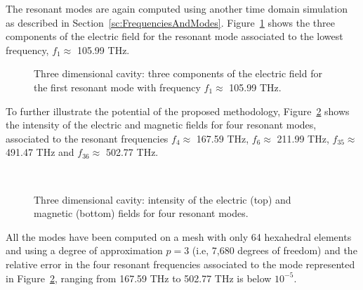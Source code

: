 The resonant modes are again computed using another time domain simulation as described in Section~\ref{sc:FrequenciesAndModes}. Figure~\ref{fig:cubeFreeSpace_1stMode} shows the three components of the electric field for the resonant mode associated to the lowest frequency, $f_1 \approx$ 105.99 THz.
\begin{figure}[!ht]
	\centering
	\caption{Three dimensional cavity: three components of the electric field for the first resonant mode with frequency $f_1 \approx$ 105.99 THz.}
	\label{fig:cubeFreeSpace_1stMode}
\end{figure}

To further illustrate the potential of the proposed methodology, Figure~\ref{fig:cubeFreeSpace_modes} shows the intensity of the electric and magnetic fields for four resonant modes, associated to the resonant frequencies $f_4\approx$ 167.59 THz, $f_6\!\approx$ 211.99 THz, $f_{35} \approx$ 491.47 THz and $f_{36} \approx$ 502.77 THz.
\begin{figure}[!ht]
	\centering
	 \\
	\caption{Three dimensional cavity: intensity of the electric (top) and magnetic (bottom) fields for four resonant modes.}
	\label{fig:cubeFreeSpace_modes}
\end{figure}

All the modes have been computed on a mesh with only 64 hexahedral elements and using a degree of approximation $p=3$ (i.e, 7,680 degrees of freedom) and the relative error in the four resonant frequencies associated to the mode represented in Figure~\ref{fig:cubeFreeSpace_modes}, ranging from 167.59 THz to 502.77 THz is below $10^{-5}$.

